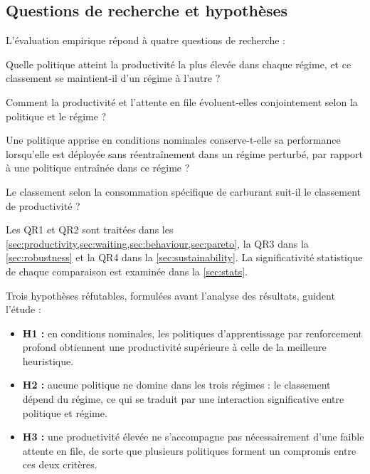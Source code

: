 \documentclass[11pt,a4paper]{article}
\newif\ifrevmarks
\newcommand{\revtag}[1]{\ifrevmarks\textsuperscript{\textcolor{red!70!black}{\scriptsize[#1]}}\fi}
\newenvironment{revbloc}[1]{\par\ifrevmarks\color{revcolor}\noindent\revtag{#1}\ \fi}{\par}
\begin{document}
\subsection{Questions de recherche et hypothèses}
\label{sec:rq}

\begin{revbloc}{M23}
L'évaluation empirique répond à quatre questions de recherche :

\begin{description}[leftmargin=1.2cm,labelwidth=1.0cm]
  \item[QR1] Quelle politique atteint la productivité la plus élevée dans chaque régime, et ce classement se maintient-il d'un régime à l'autre ?
  \item[QR2] Comment la productivité et l'attente en file évoluent-elles conjointement selon la politique et le régime ?
  \item[QR3] Une politique apprise en conditions nominales conserve-t-elle sa performance lorsqu'elle est déployée sans réentraînement dans un régime perturbé, par rapport à une politique entraînée dans ce régime ?
  \item[QR4] Le classement selon la consommation spécifique de carburant suit-il le classement de productivité ?
\end{description}

Les QR1 et QR2 sont traitées dans les \cref{sec:productivity,sec:waiting,sec:behaviour,sec:pareto}, la QR3 dans la \cref{sec:robustness} et la QR4 dans la \cref{sec:sustainability}. La significativité statistique de chaque comparaison est examinée dans la \cref{sec:stats}.

Trois hypothèses réfutables, formulées avant l'analyse des résultats, guident l'étude :

\begin{itemize}
  \item \textbf{H1 :} en conditions nominales, les politiques d'apprentissage par renforcement profond obtiennent une productivité supérieure à celle de la meilleure heuristique.
  \item \textbf{H2 :} aucune politique ne domine dans les trois régimes : le classement dépend du régime, ce qui se traduit par une interaction significative entre politique et régime.
  \item \textbf{H3 :} une productivité élevée ne s'accompagne pas nécessairement d'une faible attente en file, de sorte que plusieurs politiques forment un compromis entre ces deux critères.
\end{itemize}
\end{revbloc}
\end{document}

